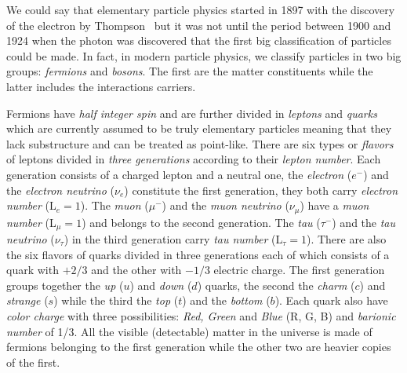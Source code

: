 We could say that elementary particle physics started in 1897 with the discovery
of the electron by Thompson~\cite{ThompsonBook} but it was not until the period
between 1900 and 1924 when the photon was discovered that the first big
classification of particles could be made. In fact, in modern particle physics,
we classify particles in two big groups: \emph{fermions} and \emph{bosons}. The
first are the matter constituents while the latter includes the interactions
carriers.

Fermions have \emph{half integer spin} and are further divided in \emph{leptons}
and \emph{quarks} which are currently assumed to be truly elementary particles
meaning that they lack substructure and can be treated as point-like. There are
six types or \emph{flavors} of leptons divided in \emph{three generations}
according to their \emph{lepton number}. Each generation consists of a charged
lepton and a neutral one, the \emph{electron} ($e^-$) and the \emph{electron
  neutrino} ($\nu_e$) constitute the first generation, they both carry
\emph{electron number} (L$_e = 1$). The \emph{muon} ($\mu^-$) and the \emph{muon
  neutrino} ($\nu_\mu$) have a \emph{muon number} (L$_\mu = 1$) and belongs to
the second generation. The \emph{tau} ($\tau^-$) and the \emph{tau neutrino}
($\nu_\tau$) in the third generation carry \emph{tau number} (L$_\tau =
1$). There are also the six flavors of quarks divided in three generations each
of which consists of a quark with $+2/3$ and the other with $-1/3$ electric
charge. The first generation groups together the \emph{up} ($u$) and \emph{down}
($d$) quarks, the second the \emph{charm} ($c$) and \emph{strange} ($s$) while
the third the \emph{top} ($t$) and the \emph{bottom} ($b$). Each quark also have
\emph{color charge} with three possibilities: \emph{Red, Green} and \emph{Blue}
(R, G, B) and \emph{barionic number} of 1/3. All the visible (detectable) matter
in the universe is made of fermions belonging to the first generation while the
other two are heavier copies of the first.

